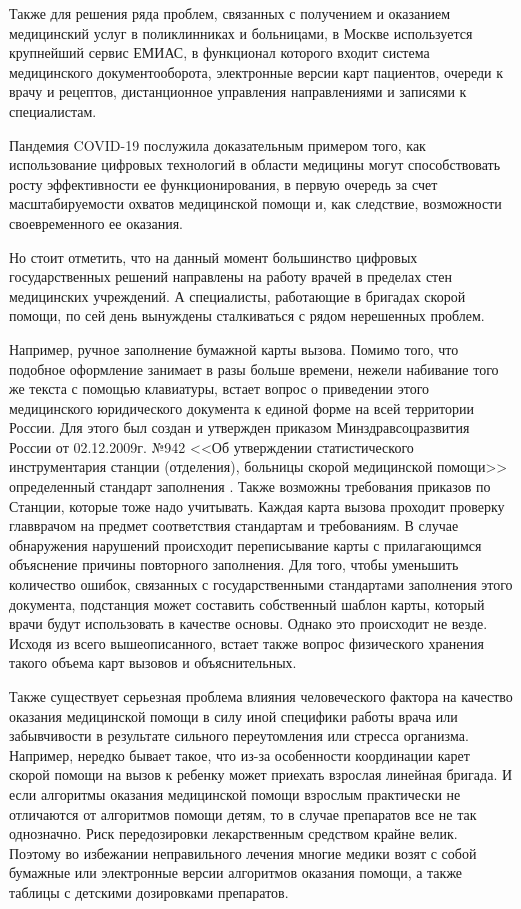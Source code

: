 Также для решения ряда проблем, связанных с получением и оказанием медицинский услуг в поликлинниках и больницами, в Москве используется крупнейший сервис ЕМИАС, в функционал которого входит система медицинского документооборота, электронные версии карт пациентов, очереди к врачу и рецептов, дистанционное управления направлениями и записями к специалистам.

Пандемия COVID-19 послужила доказательным примером того, как использование цифровых технологий в области медицины могут способствовать росту эффективности ее функционирования, в первую очередь за счет масштабируемости охватов медицинской помощи и, как следствие, возможности своевременного ее оказания.

Но стоит отметить, что на данный момент большинство цифровых государственных решений направлены на работу врачей в пределах стен медицинских учреждений.  А специалисты, работающие в бригадах скорой помощи, по сей день вынуждены сталкиваться с рядом нерешенных проблем.

Например, ручное заполнение бумажной карты вызова. Помимо того, что подобное оформление занимает в разы больше времени, нежели набивание того же текста с помощью клавиатуры, встает вопрос о приведении этого медицинского юридического документа к единой форме на всей территории России. Для этого был создан и утвержден приказом Минздравсоцразвития России от 02.12.2009г. №942 <<Об утверждении статистического инструментария станции (отделения), больницы скорой медицинской помощи>>  определенный стандарт заполнения \cite{ПриказКарт}. Также возможны требования приказов по Станции, которые тоже надо учитывать. Каждая карта вызова проходит проверку главврачом на предмет соответствия стандартам и требованиям. В случае обнаружения нарушений происходит переписывание карты с прилагающимся объяснение причины повторного заполнения. Для того, чтобы уменьшить количество ошибок, связанных с государственными стандартами заполнения этого документа, подстанция может составить собственный шаблон карты, который врачи будут использовать в качестве основы. Однако это происходит не везде. Исходя из всего вышеописанного, встает также вопрос физического хранения такого объема карт вызовов и объяснительных.

Также существует серьезная проблема влияния человеческого фактора на качество оказания медицинской помощи в силу иной специфики работы врача или забывчивости в результате сильного переутомления или стресса организма. Например, нередко бывает такое, что из-за особенности координации карет скорой помощи на вызов к ребенку может приехать взрослая линейная бригада. И если алгоритмы оказания медицинской помощи взрослым практически не отличаются от алгоритмов помощи детям, то в случае препаратов все не так однозначно. Риск передозировки лекарственным средством крайне велик. Поэтому во избежании неправильного лечения многие медики возят с собой бумажные или электронные версии алгоритмов оказания помощи, а также таблицы с детскими дозировками препаратов.

